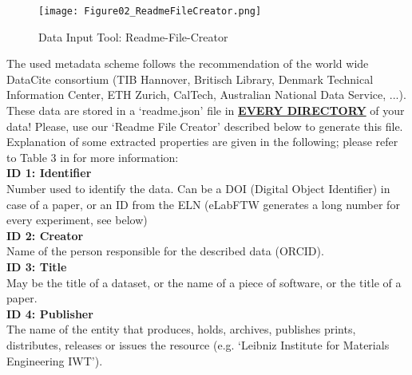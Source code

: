 \begin{wrapfigure}{r}{0.5\linewidth}
  \vspace{-1em}
  \texttt{[image: Figure02\_ReadmeFileCreator.png]}
  \caption{Data Input Tool: Readme-File-Creator}
  \label{fig:readme-creator}
\end{wrapfigure}
The used metadata scheme follows the recommendation of the world wide DataCite
consortium (TIB Hannover, Britisch Library, Denmark Technical Information
Center, ETH Zurich, CalTech, Australian National Data Service, ...). These data
are stored in a `readme.json' file in \textbf{\underline{EVERY DIRECTORY}} of
your data! Please, use our `Readme File Creator' described below to generate
this file.\\
Explanation of some extracted properties are given in the following; please
refer to Table 3 in \cite{datacite2019} for more information: \\[6pt]
%
\textbf{ID 1: Identifier} \\
Number used to identify the data. Can be a DOI (Digital Object Identifier) in
case of a paper, or an ID from the ELN (eLabFTW generates a long number for
every experiment, see below) \\[6pt]
%
\textbf{ID 2: Creator} \\
Name of the person responsible for the described data (ORCID). \\[6pt]
%
\textbf{ID 3: Title} \\
May be the title of a dataset, or the name of a piece of software, or the
title of a paper. \\[6pt]
%
\textbf{ID 4: Publisher} \\
The name of the entity that produces, holds, archives, publishes prints,
distributes, releases or issues the resource (e.g. `Leibniz Institute for
Materials Engineering IWT'). \\[6pt]


